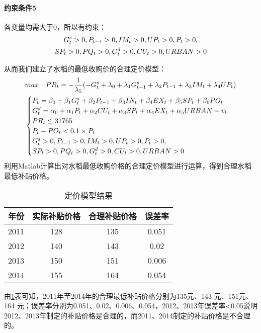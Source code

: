 \documentclass[withoutpreface,bwprint]{cumcmthesis} %
\begin{document}
\paragraph{约束条件5}
各变量均需大于0，所以有约束：
\begin{gather}
G_t^s>0,P_{t-1}>0,IM_t>0,UP_t>0,P_t>0,\notag\\
SP_t>0,PQ_t>0,G_t^d>0,CU_t>0,URBAN>0\notag
\end{gather}\par
从而我们建立了水稻的最低收购价的合理定价模型：
\begin{gather}
max\quad PR_{t}=-\frac{1}{\lambda_{5}}(-G_{t}^{s}+\lambda_{0}+\lambda_{1}G_{t-1}^{s}+\lambda_{2}P_{t-1}+\lambda_{3}IM_{t}+\lambda_{4}UP_{t})\notag\\
\begin{cases}
	P_{t}=\beta_{0}+\beta_{1}G_{t}^{s}+\beta_{2}P_{t-1}+\beta_{3}IN_{t}+\beta_{4}EX_{t}+\beta_{5}SP_{t}+\beta_{6}PO_{t}\\
	G_{t}^{d}=\alpha_{0}+\alpha_{1}P_{t}+\alpha_{2}CU_{t}+\alpha_{3}S P_{t}+\alpha_{4}EX_{t}+\alpha_{5}URBAN+v_{t}\\	
	PR_t\leq31765\\
	P_t-PO_t<0.1\times P_t\\
	G_t^s>0,P_{t-1}>0,IM_t>0,UP_t>0,P_t>0,\\
	SP_t>0,PQ_t>0,G_t^d>0,CU_t>0,URBAN>0
\end{cases}
\end{gather}
利用Matlab计算出对水稻最低收购价格的合理定价模型进行运算，得到合理水稻最低补贴价格。
\begin{table}[!htbp]
		\centering
		\caption{定价模型结果}
		\label{tab:mxjg}
		\setlength\tabcolsep{20pt}%
		\begin{tabular}{cccc}
		\toprule[1.5pt]
		年份 & 实际补贴价格 & 合理补贴价格 & 误差率 \\
		\midrule[1pt]
	2011 & 128 & 135 &0.051\\
	2012 & 140 & 143 &0.02\\
	2013 & 150 & 151 &0.006\\
	2014 & 155 & 164 &0.054\\
		\bottomrule[1.5pt]
		\end{tabular}
	\end{table}
由\ref{tab:mxjg}表可知，2011年至2014年的合理最低补贴价格分别为135元、143 元、151元、164 元；误差率分别为0.051、0.02、0.006、0.054，2012、2013年误差率<0.05说明2012、2013年制定的补贴价格是合理的，而2011、2014制定的补贴价格是不合理的。
\end{document}
